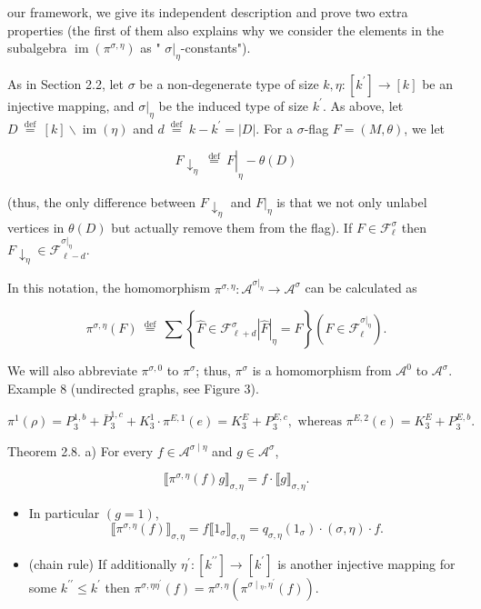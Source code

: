 \documentclass[10pt]{article}
\begin{document}
our framework, we give its independent description and prove two extra properties (the first of them also explains why we consider the elements in the subalgebra $\operatorname{im}\left(\pi^{\sigma, \eta}\right)$ as " $\left.\sigma\right|_{\eta}$-constants").

As in Section 2.2, let $\sigma$ be a non-degenerate type of size $k, \eta:\left[k^{\prime}\right] \longrightarrow[k]$ be an injective mapping, and $\left.\sigma\right|_{\eta}$ be the induced type of size $k^{\prime}$. As above, let $D \stackrel{\text { def }}{=}[k] \backslash \operatorname{im}(\eta)$ and $d \stackrel{\text { def }}{=} k-k^{\prime}=|D|$. For a $\sigma$-flag $F=(M, \theta)$, we let

$$
\left.F \downarrow_{\eta} \stackrel{\text { def }}{=} F\right|_{\eta}-\theta(D)
$$

(thus, the only difference between $F \downarrow_{\eta}$ and $\left.F\right|_{\eta}$ is that we not only unlabel vertices in $\theta(D)$ but actually remove them from the flag). If $F \in \mathcal{F}_{\ell}^{\sigma}$ then $F \downarrow_{\eta} \in \mathcal{F}_{\ell-d}^{\left.\sigma\right|_{\eta}}$.

In this notation, the homomorphism $\pi^{\sigma, \eta}: \mathcal{A}^{\left.\sigma\right|_{\eta}} \longrightarrow \mathcal{A}^{\sigma}$ can be calculated as


\begin{equation*}
\pi^{\sigma, \eta}(F) \stackrel{\text { def }}{=} \sum\left\{\widehat{F} \in \mathcal{F}_{\ell+d}^{\sigma}|\widehat{F}|_{\eta}=F\right\}\left(F \in \mathcal{F}_{\ell}^{\left.\sigma\right|_{\eta}}\right) . \tag{10}
\end{equation*}


We will also abbreviate $\pi^{\sigma, 0}$ to $\pi^{\sigma}$; thus, $\pi^{\sigma}$ is a homomorphism from $\mathcal{A}^{0}$ to $\mathcal{A}^{\sigma}$.\\
Example 8 (undirected graphs, see Figure 3).

$$
\pi^{1}(\rho)=P_{3}^{1, b}+\bar{P}_{3}^{1, c}+K_{3}^{1} \cdot \pi^{E, 1}(e)=K_{3}^{E}+P_{3}^{E, c}, \text { whereas } \pi^{E, 2}(e)=K_{3}^{E}+P_{3}^{E, b} .
$$

Theorem 2.8. a) For every $f \in \mathcal{A}^{\sigma \mid \eta}$ and $g \in \mathcal{A}^{\sigma}$,

$$
\llbracket \pi^{\sigma, \eta}(f) g \rrbracket_{\sigma, \eta}=f \cdot \llbracket g \rrbracket_{\sigma, \eta} .
$$

\begin{itemize}
  \item[] In particular $(g=1)$,
$$
\llbracket \pi^{\sigma, \eta}(f) \rrbracket_{\sigma, \eta}=f \llbracket 1_{\sigma} \rrbracket_{\sigma, \eta}=q_{\sigma, \eta}\left(1_{\sigma}\right) \cdot(\sigma, \eta) \cdot f .
$$
  \item[b)] (chain rule) If additionally $\eta^{\prime}:\left[k^{\prime \prime}\right] \longrightarrow\left[k^{\prime}\right]$ is another injective mapping for some $k^{\prime \prime} \leq k^{\prime}$ then $\pi^{\sigma, \eta \eta^{\prime}}(f)=\pi^{\sigma, \eta}\left(\pi^{\sigma \mid{ }_{\eta}, \eta^{\prime}}(f)\right)$.
\end{itemize}
\end{document}
